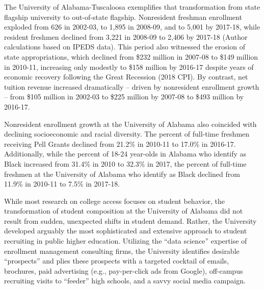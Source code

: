 \documentclass[twoside]{article}
\begin{document}
The University of Alabama-Tuscaloosa exemplifies that transformation from state flagship university to out-of-state flagship.  Nonresident freshman enrollment exploded from 626 in 2002-03, to 1,895 in 2008-09, and to 5,001 by 2017-18, while resident freshmen declined from 3,221 in 2008-09 to 2,406 by 2017-18 (Author calculations based on IPEDS data). This period also witnessed the erosion of state appropriations, which declined from \$232 million in 2007-08 to \$149 million in 2010-11, increasing only modestly to \$158 million by 2016-17 despite years of economic recovery following the Great Recession  (2018 CPI).  By contrast, net tuition revenue increased dramatically -- driven by nonresident enrollment growth -- from \$105 million in 2002-03 to \$225 million by 2007-08 to \$493 million by 2016-17.

Nonresident enrollment growth at the University of Alabama also coincided with declining socioeconomic and racial diversity.  The percent of full-time freshmen receiving Pell Grants declined from 21.2\% in 2010-11 to 17.0\% in 2016-17.  Additionally, while the percent of 18-24 year-olds in Alabama who identify as Black increased from 31.4\% in 2010 to 32.3\% in 2017, the percent of full-time freshmen at the University of Alabama who identify as Black declined from 11.9\% in 2010-11 to 7.5\% in 2017-18.

While most research on college access focuses on student behavior, the transformation of student composition at the University of Alabama did not result from sudden, unexpected shifts in student demand. Rather, the University developed arguably the most sophisticated and extensive approach to student recruiting in public higher education.  Utilizing the ``data science'' expertise of enrollment management consulting firms, the University identifies desirable ``prospects'' and plies these prospects with a targeted cocktail of emails, brochures, paid advertising (e.g., pay-per-click ads from Google), off-campus recruiting visits to ``feeder'' high schools, and a savvy social media campaign.
\end{document}
